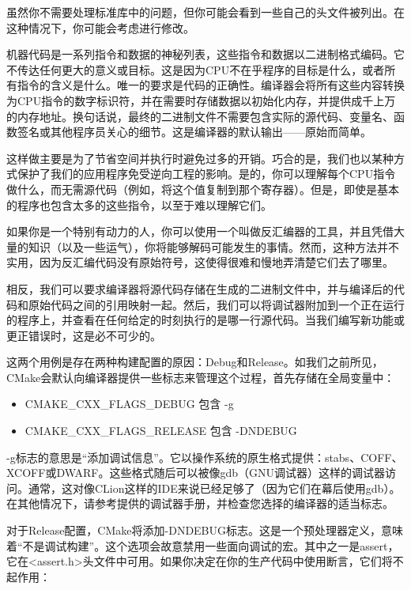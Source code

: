 虽然你不需要处理标准库中的问题，但你可能会看到一些自己的头文件被列出。在这种情况下，你可能会考虑进行修改。


机器代码是一系列指令和数据的神秘列表，这些指令和数据以二进制格式编码。它不传达任何更大的意义或目标。这是因为CPU不在乎程序的目标是什么，或者所有指令的含义是什么。唯一的要求是代码的正确性。编译器会将所有这些内容转换为CPU指令的数字标识符，并在需要时存储数据以初始化内存，并提供成千上万的内存地址。换句话说，最终的二进制文件不需要包含实际的源代码、变量名、函数签名或其他程序员关心的细节。这是编译器的默认输出——原始而简单。

这样做主要是为了节省空间并执行时避免过多的开销。巧合的是，我们也以某种方式保护了我们的应用程序免受逆向工程的影响。是的，你可以理解每个CPU指令做什么，而无需源代码（例如，将这个值复制到那个寄存器）。但是，即使是基本的程序也包含太多的这些指令，以至于难以理解它们。

如果你是一个特别有动力的人，你可以使用一个叫做反汇编器的工具，并且凭借大量的知识（以及一些运气），你将能够解码可能发生的事情。然而，这种方法并不实用，因为反汇编代码没有原始符号，这使得很难和慢地弄清楚它们去了哪里。

相反，我们可以要求编译器将源代码存储在生成的二进制文件中，并与编译后的代码和原始代码之间的引用映射一起。然后，我们可以将调试器附加到一个正在运行的程序上，并查看在任何给定的时刻执行的是哪一行源代码。当我们编写新功能或更正错误时，这是必不可少的。

这两个用例是存在两种构建配置的原因：Debug和Release。如我们之前所见，CMake会默认向编译器提供一些标志来管理这个过程，首先存储在全局变量中：

\begin{itemize}
\item
CMAKE\_CXX\_FLAGS\_DEBUG 包含 -g

\item
CMAKE\_CXX\_FLAGS\_RELEASE 包含 -DNDEBUG
\end{itemize}

-g标志的意思是“添加调试信息”。它以操作系统的原生格式提供：stabs、COFF、XCOFF或DWARF。这些格式随后可以被像gdb（GNU调试器）这样的调试器访问。通常，这对像CLion这样的IDE来说已经足够了（因为它们在幕后使用gdb）。在其他情况下，请参考提供的调试器手册，并检查您选择的编译器的适当标志。

对于Release配置，CMake将添加-DNDEBUG标志。这是一个预处理器定义，意味着“不是调试构建”。这个选项会故意禁用一些面向调试的宏。其中之一是assert，它在<assert.h>头文件中可用。如果你决定在你的生产代码中使用断言，它们将不起作用：

